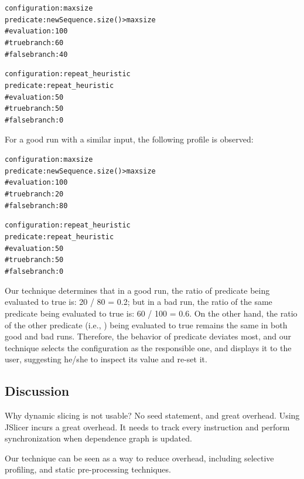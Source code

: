 \begin{CodeOut}
\begin{alltt}
configuration: maxsize 
predicate: newSequence.size() > maxsize
    \# evaluation: 100
    \# true branch: 60
    \# false branch: 40

configuration: repeat_heuristic
predicate: repeat_heuristic
    \# evaluation: 50
    \# true branch: 50
    \# false branch: 0
\end{alltt}
\end{CodeOut}

For a good run with a similar input, the following profile is observed:

\begin{CodeOut}
\begin{alltt}
configuration: maxsize 
predicate: newSequence.size() > maxsize
    \# evaluation: 100
    \# true branch: 20
    \# false branch: 80

configuration: repeat_heuristic
predicate: repeat_heuristic
    \# evaluation: 50
    \# true branch: 50
    \# false branch: 0
\end{alltt}
\end{CodeOut}

Our technique determines that in a good run, the ratio of predicate 
 being evaluated to true is: 20 / 80 = 0.2;
but in a bad run, the ratio of the same predicate being evaluated to true is: 60 / 100 = 0.6.
On the other hand, the ratio of the other predicate (i.e., ) being evaluated to true
remains the same in both good and bad runs. Therefore, the behavior
of predicate  deviates most, and our technique
selects the  configuration as the responsible one, and displays it to the user, suggesting he/she
to inspect its value and re-set it.

\subsection{Discussion}
Why dynamic slicing is not usable? No seed statement, and great overhead. Using JSlicer incurs
a great overhead. It needs to track every instruction and
perform synchronization when dependence graph is updated.

Our technique can be seen as a way to reduce overhead,
including selective profiling, and static pre-processing
techniques.

